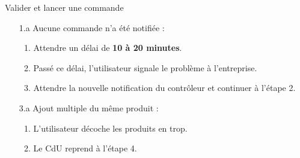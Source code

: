 \begin{UseCase}{Valider et lancer une commande}
\begin{UseCaseExtension}
    \begin{enumerate}
        \item[1.a] Aucune commande n'a été notifiée :
        \begin{enumerate}
            \item Attendre un délai de \textbf{10 à 20 minutes}.
            \item Passé ce délai, l'utilisateur signale le problème à l'entreprise.
            \item Attendre la nouvelle notification du contrôleur et continuer à l'étape 2.
        \end{enumerate}
        \item[3.a] Ajout multiple du même produit :
        \begin{enumerate}
            \item L'utilisateur décoche les produits en trop.
            \item Le CdU reprend à l'étape 4.
        \end{enumerate}
    \end{enumerate}
\end{UseCaseExtension}

\end{UseCase}
